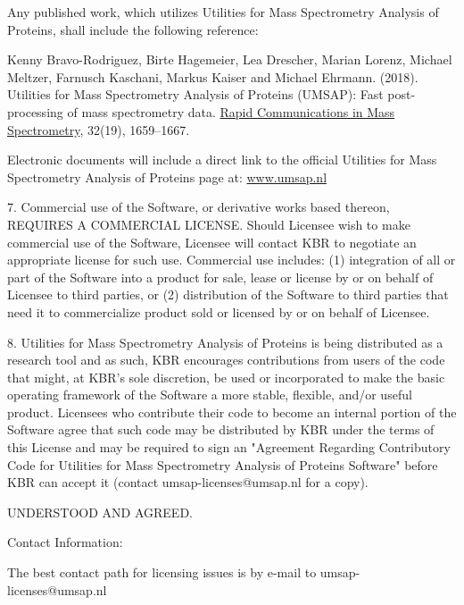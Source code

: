 Any published work, which utilizes Utilities for Mass Spectrometry Analysis of Proteins, shall include the following reference:

Kenny Bravo-Rodriguez, Birte Hagemeier, Lea Drescher, Marian Lorenz, Michael Meltzer, Farnusch Kaschani, Markus Kaiser and Michael Ehrmann. (\num{2018}). Utilities for Mass Spectrometry Analysis of Proteins (UMSAP): Fast post-processing of mass spectrometry data. \href{https://onlinelibrary.wiley.com/doi/10.1002/rcm.8243}{Rapid Communications in Mass Spectrometry}, \num{32}(\num{19}), \numrange[range-phrase = --]{1659}{1667}.

Electronic documents will include a direct link to the official Utilities for Mass Spectrometry Analysis of Proteins page at:
\href{https://www.umsap.nl/}{www.umsap.nl}

7. Commercial use of the Software, or derivative works based thereon, REQUIRES A COMMERCIAL LICENSE.  Should Licensee wish to make commercial use of the Software, Licensee will contact KBR to negotiate an appropriate license for such use. Commercial use includes: 
(1) integration of all or part of the Software into a product for sale, lease or license by or on behalf of Licensee to third parties, or 
(2) distribution of the Software to third parties that need it to commercialize product sold or licensed by or on behalf of Licensee.

8. Utilities for Mass Spectrometry Analysis of Proteins is being distributed as a research tool and as such, KBR encourages contributions from users of the code that might, at KBR's sole discretion, be used or incorporated to make the basic operating framework of the Software a more stable, flexible, and/or useful product. Licensees who contribute their code to become an internal portion of the Software agree that such code may be distributed by KBR under the terms of this License and may be required to sign an "Agreement Regarding Contributory Code for Utilities for Mass Spectrometry Analysis of Proteins Software" before KBR can accept it (contact umsap-licenses@umsap.nl for a copy).

UNDERSTOOD AND AGREED.

Contact Information:

The best contact path for licensing issues is by e-mail to umsap-licenses@umsap.nl
